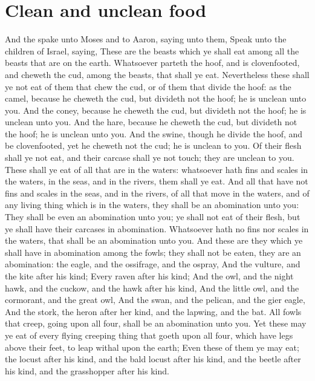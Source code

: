 \section*{Clean and unclean food}
\begin{biblechapter} %
\verse And the \LORD spake unto Moses and to Aaron, saying unto them,
\verse Speak unto the children of Israel, saying, These are the beasts which ye shall eat among all the beasts that are on the earth.
\verse Whatsoever parteth the hoof, and is clovenfooted, and cheweth the cud, among the beasts, that shall ye eat.
\verse Nevertheless these shall ye not eat of them that chew the cud, or of them that divide the hoof: as the camel, because he cheweth the cud, but divideth not the hoof; he is unclean unto you.
\verse And the coney, because he cheweth the cud, but divideth not the hoof; he is unclean unto you.
\verse And the hare, because he cheweth the cud, but divideth not the hoof; he is unclean unto you.
\verse And the swine, though he divide the hoof, and be clovenfooted, yet he cheweth not the cud; he is unclean to you.
\verse Of their flesh shall ye not eat, and their carcase shall ye not touch; they are unclean to you.
\verse These shall ye eat of all that are in the waters: whatsoever hath fins and scales in the waters, in the seas, and in the rivers, them shall ye eat.
\verse And all that have not fins and scales in the seas, and in the rivers, of all that move in the waters, and of any living thing which is in the waters, they shall be an abomination unto you:
\verse They shall be even an abomination unto you; ye shall not eat of their flesh, but ye shall have their carcases in abomination.
\verse Whatsoever hath no fins nor scales in the waters, that shall be an abomination unto you.
\verse And these are they which ye shall have in abomination among the fowls; they shall not be eaten, they are an abomination: the eagle, and the ossifrage, and the ospray,
\verse And the vulture, and the kite after his kind;
\verse Every raven after his kind;
\verse And the owl, and the night hawk, and the cuckow, and the hawk after his kind,
\verse And the little owl, and the cormorant, and the great owl,
\verse And the swan, and the pelican, and the gier eagle,
\verse And the stork, the heron after her kind, and the lapwing, and the bat.
\verse All fowls that creep, going upon all four, shall be an abomination unto you.
\verse Yet these may ye eat of every flying creeping thing that goeth upon all four, which have legs above their feet, to leap withal upon the earth;
\verse Even these of them ye may eat; the locust after his kind, and the bald locust after his kind, and the beetle after his kind, and the grasshopper after his kind.

\end{biblechapter}
